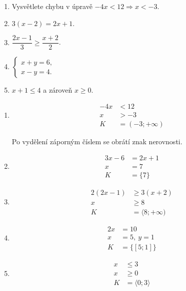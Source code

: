 \documentclass[11pt,a4paper]{article}
\begin{document}
\begin{zadaniReseniBox}[title={Domácí úkol}]
\begin{enumerate}[label=\alph*),itemsep=2pt]
\item Vysvětlete chybu v úpravě $-4x<12\Rightarrow x<-3$.
\item $3(x-2)=2x+1$.
\item $\dfrac{2x-1}{3}\ge\dfrac{x+2}{2}$.
\item $\begin{cases}x+y=6,\\x-y=4.\end{cases}$
\item $x+1\le4$ a zároveň $x\ge0$.
\end{enumerate}
\tcblower
\begin{enumerate}[label=\alph*),itemsep=1pt]
\item
\[\begin{aligned}
-4x&<12 \\
x&>-3 \\
K&=(-3;+\infty)
\end{aligned}\]\par Po vydělení záporným číslem se obrátí znak nerovnosti.
\item
\[\begin{aligned}
3x-6&=2x+1 \\
x&=7 \\
K&=\{7\}
\end{aligned}\]
\item
\[\begin{aligned}
2(2x-1)&\ge3(x+2) \\
x&\ge8 \\
K&=\langle8;+\infty)
\end{aligned}\]
\item
\[\begin{aligned}
2x&=10 \\
x&=5,\ y=1 \\
K&=\{[5;1]\}
\end{aligned}\]
\item
\[\begin{aligned}
x&\le3 \\
x&\ge0 \\
K&=\langle0;3\rangle
\end{aligned}\]
\end{enumerate}
\end{zadaniReseniBox}
\end{document}
